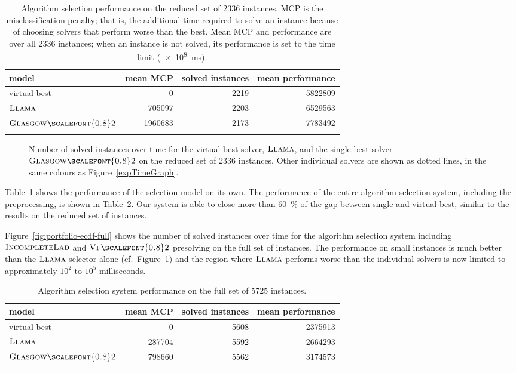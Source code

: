 \documentclass{llncs}
\newcommand{\VFtwo}{$\textsc{Vf{\scalefont{0.8}2}}$\xspace}
\newcommand{\IncompleteLAD}{$\textsc{IncompleteLad}$\xspace}
\newcommand{\GlasgowTwo}{$\textsc{Glasgow{\scalefont{0.8}2}}$\xspace}
\newcommand{\LLAMA}{$\textsc{Llama}$\xspace}
\begin{document}
\begin{table}[p]
    \centering\setlength{\tabcolsep}{1em}
\begin{tabular}{lrrr}
  \toprule
model & mean MCP & solved instances & mean performance\\
  \midrule
virtual best & 0 & 2219 & 5822809\\
\LLAMA & 705097 & 2203 & 6529563\\
\GlasgowTwo & 1960683 & 2173 & 7783492\\
   \bottomrule \\
\end{tabular}
\caption{Algorithm selection performance on the reduced set of 2336 instances. MCP is the
misclassification penalty; that is, the additional time required to solve an instance because of
choosing solvers that perform worse than the best. Mean MCP and performance are over all 2336 instances; when an
instance is not solved, its performance is set to the time limit
(\SI{e8}{\ms}).}\label{tab:res}
\end{table}

\begin{figure}[p]


\caption{Number of solved instances over time for the virtual best solver,
\LLAMA, and the single best solver \GlasgowTwo on the reduced set of 2336
instances. Other individual solvers are shown as dotted lines, in the same
colours as Figure~\ref{expTimeGraph}. }
\label{fig:portfolio-ecdf}
\end{figure}

Table~\ref{tab:res} shows the performance of the selection model on its own. The
performance of the entire algorithm selection system, including the
preprocessing, is shown in Table~\ref{tab:resfull}. Our system is able to close
more than \SI{60}{\percent} of the gap between single and virtual best, similar
to the results on the reduced set of instances.

Figure~\ref{fig:portfolio-ecdf-full} shows the number of solved instances over
time for the algorithm selection system including \IncompleteLAD and \VFtwo
presolving on the full set of instances. The performance on small instances is
much better than the \LLAMA selector alone (cf.\
Figure~\ref{fig:portfolio-ecdf}) and the region where \LLAMA performs worse than
the individual solvers is now limited to approximately $10^2$ to $10^5$
milliseconds.

\begin{table}[p]
    \centering\setlength{\tabcolsep}{1em}
\begin{tabular}{lrrr}
  \toprule
model & mean MCP & solved instances & mean performance\\
  \midrule
virtual best & 0 & 5608 & 2375913\\
\LLAMA & 287704 & 5592 & 2664293\\
\GlasgowTwo & 798660 & 5562 & 3174573\\
   \bottomrule \\
\end{tabular}
\caption{Algorithm selection system performance on the full set of 5725
instances.}\label{tab:resfull}
\end{table}
\end{document}
